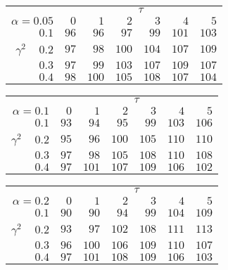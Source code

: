 \begin{tabular}{r|rrrrrr}
\hline\hline
 &\multicolumn{6}{c}{$\tau$} \\ 
 $\alpha = 0.05$ & $0$ & $1$ & $2$ & $3$ & $4$ & $5$ \\ 
 \hline$0.1$ & $ 96$ & $ 96$ & $ 97$ & $ 99$ & $101$ & $103$\\ 
$\gamma^2\;\;\;$ $0.2$ & $ 97$ & $ 98$ & $100$ & $104$ & $107$ & $109$\\ 
$0.3$ & $ 97$ & $ 99$ & $103$ & $107$ & $109$ & $107$\\ 
$0.4$ & $ 98$ & $100$ & $105$ & $108$ & $107$ & $104$\\ 
 \hline 
 \end{tabular}
 
 \vspace{2em} 
 
\begin{tabular}{r|rrrrrr}
\hline\hline
 &\multicolumn{6}{c}{$\tau$} \\ 
 $\alpha = 0.1$ & $0$ & $1$ & $2$ & $3$ & $4$ & $5$ \\ 
 \hline$0.1$ & $ 93$ & $ 94$ & $ 95$ & $ 99$ & $103$ & $106$\\ 
$\gamma^2\;\;\;$ $0.2$ & $ 95$ & $ 96$ & $100$ & $105$ & $110$ & $110$\\ 
$0.3$ & $ 97$ & $ 98$ & $105$ & $108$ & $110$ & $108$\\ 
$0.4$ & $ 97$ & $101$ & $107$ & $109$ & $106$ & $102$\\ 
 \hline 
 \end{tabular}
 
 \vspace{2em} 
 
\begin{tabular}{r|rrrrrr}
\hline\hline
 &\multicolumn{6}{c}{$\tau$} \\ 
 $\alpha = 0.2$ & $0$ & $1$ & $2$ & $3$ & $4$ & $5$ \\ 
 \hline$0.1$ & $ 90$ & $ 90$ & $ 94$ & $ 99$ & $104$ & $109$\\ 
$\gamma^2\;\;\;$ $0.2$ & $ 93$ & $ 97$ & $102$ & $108$ & $111$ & $113$\\ 
$0.3$ & $ 96$ & $100$ & $106$ & $109$ & $110$ & $107$\\ 
$0.4$ & $ 97$ & $101$ & $108$ & $109$ & $106$ & $103$\\ 
 \hline 
 \end{tabular}